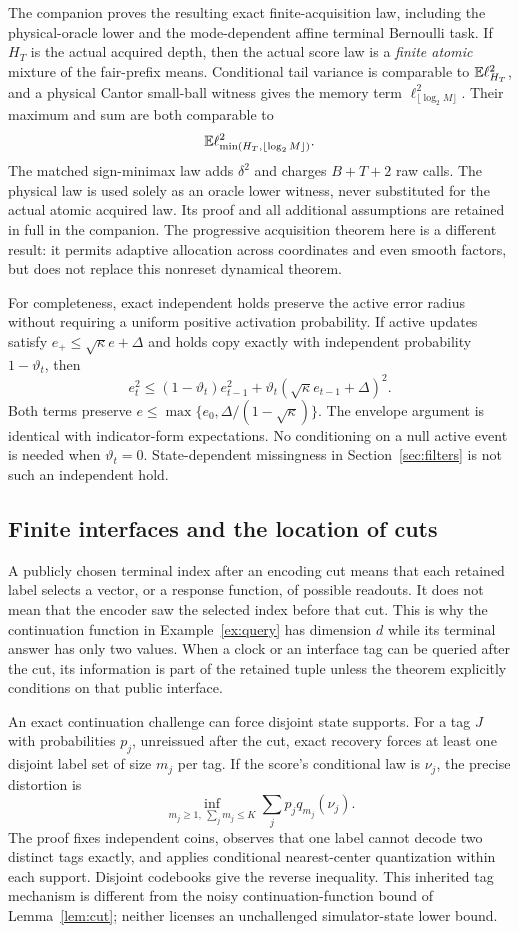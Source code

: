 The companion proves the resulting exact finite-acquisition law, including the physical-oracle lower and the mode-dependent affine terminal Bernoulli task. If $H_T$ is the actual acquired depth, then the actual score law is a \emph{finite atomic} mixture of the fair-prefix means. Conditional tail variance is comparable to $\mathbb E\ell_{H_T}^2$, and a physical Cantor small-ball witness gives the memory term $\ell_{\lfloor\log_2M\rfloor}^2$. Their maximum and sum are both comparable to
\[
 \mathbb E\ell_{\min(H_T,\lfloor\log_2M\rfloor)}^2.
\]
The matched sign-minimax law adds $\delta^2$ and charges $B+T+2$ raw calls. The physical law is used solely as an oracle lower witness, never substituted for the actual atomic acquired law. Its proof and all additional assumptions are retained in full in the companion. The progressive acquisition theorem here is a different result: it permits adaptive allocation across coordinates and even smooth factors, but does not replace this nonreset dynamical theorem.

For completeness, exact independent holds preserve the active error radius without requiring a uniform positive activation probability. If active updates satisfy $e_+\le\sqrt\kappa e+\Delta$ and holds copy exactly with independent probability $1-\vartheta_t$, then
\[
 e_t^2\le(1-\vartheta_t)e_{t-1}^2+
       \vartheta_t(\sqrt\kappa e_{t-1}+\Delta)^2.
\]
Both terms preserve $e\le\max\{e_0,\Delta/(1-\sqrt\kappa)\}$. The envelope argument is identical with indicator-form expectations. No conditioning on a null active event is needed when $\vartheta_t=0$. State-dependent missingness in Section~\ref{sec:filters} is not such an independent hold.

\subsection{Finite interfaces and the location of cuts}
A publicly chosen terminal index after an encoding cut means that each retained label selects a vector, or a response function, of possible readouts. It does not mean that the encoder saw the selected index before that cut. This is why the continuation function in Example~\ref{ex:query} has dimension $d$ while its terminal answer has only two values. When a clock or an interface tag can be queried after the cut, its information is part of the retained tuple unless the theorem explicitly conditions on that public interface.

An exact continuation challenge can force disjoint state supports. For a tag $J$ with probabilities $p_j$, unreissued after the cut, exact recovery forces at least one disjoint label set of size $m_j$ per tag. If the score's conditional law is $\nu_j$, the precise distortion is
\[
 \inf_{m_j\ge1,\ \sum_jm_j\le K}\sum_jp_jq_{m_j}(\nu_j).
\]
The proof fixes independent coins, observes that one label cannot decode two distinct tags exactly, and applies conditional nearest-center quantization within each support. Disjoint codebooks give the reverse inequality. This inherited tag mechanism is different from the noisy continuation-function bound of Lemma~\ref{lem:cut}; neither licenses an unchallenged simulator-state lower bound.

